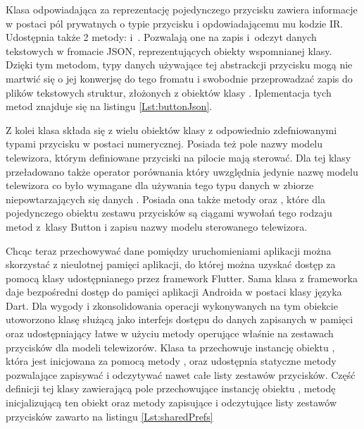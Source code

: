 \documentclass[12pt,twoside]{article}
\begin{document}
Klasa  odpowiadająca za reprezentację  pojedynczego przycisku zawiera informacje w postaci pól prywatnych o typie przycisku i opdowiadającemu mu kodzie IR. Udostępnia także 2 metody:  i~. Pozwalają one na zapis i~odczyt danych tekstowych w fromacie JSON, reprezentujących obiekty wspomnianej klasy. Dzięki tym metodom, typy danych używające tej abstrackcji przycisku mogą nie martwić się o jej konwerjsę do tego fromatu i swobodnie przeprowadzać zapis do plików tekstowych struktur, złożonych z obiektów klasy . Iplementacja tych metod znajduje się na listingu \ref*{Lst:buttonJson}.


Z kolei klasa  składa się z wielu obiektów klasy  z odpowiednio zdefniowanymi typami przycisku w postaci numerycznej. Posiada też pole nazwy modelu telewizora, którym definiowane przyciski na pilocie mają sterować. Dla tej klasy przeładowano także operator porównania który uwzględnia jedynie nazwę modelu telewizora co było wymagane dla używania tego typu danych w zbiorze niepowtarzających się danych . Posiada ona także metody  oraz , które dla pojedynczego obiektu zestawu przycisków są ciągami wywołań tego rodzaju metod z~klasy Button i zapisu nazwy modelu sterowanego telewizora. 

Chcąc teraz przechowywać dane pomiędzy uruchomieniami aplikacji można skorzystać z nieulotnej pamięci aplikacji, do której można uzyskać dostęp za pomocą klasy \cite{sharedPreferences} udostępnianego przez framework Flutter. Sama klasa z frameworka daje bezpośredni dostęp do pamięci aplikacji Androida w postaci klasy języka Dart. Dla wygody i zkonsolidowania operacji wykonywanych na tym obiekcie utoworzono klasę  służącą jako interfejs dostępu do danych zapisanych w pamięci oraz udostępniający łatwe w użyciu metody operujące właśnie na zestawach przycisków dla modeli telewizorów. Klasa ta przechowuje instancję obiektu , która jest inicjowana za pomocą metody , oraz udostępnia statyczne metody pozwalające zapisywać i odczytywać nawet całe listy zestawów przycisków. Część definicji tej klasy zawierającą pole przechowujące instancję obiektu , metodę inicjalizującą ten obiekt oraz metody zapisujące i odczytujące listy zestawów przycisków zawarto na listingu \ref*{Lst:sharedPrefs}
\end{document}
